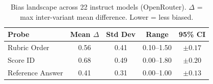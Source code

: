 \begin{table}[h]
\centering\small
\caption{Bias landscape across 22 instruct models (OpenRouter).
$\Delta$ = max inter-variant mean difference. Lower = less biased.}
\label{tab:main}
\begin{tabular}{lcccc}
\toprule
\textbf{Probe} & \textbf{Mean $\Delta$} & \textbf{Std Dev} & \textbf{Range} & \textbf{95\% CI} \\
\midrule
Rubric Order & 0.56 & 0.41 & 0.10--1.50 & $\pm 0.17$ \\
Score ID & 0.68 & 0.49 & 0.00--1.80 & $\pm 0.20$ \\
Reference Answer & 0.41 & 0.31 & 0.00--1.00 & $\pm 0.13$ \\
\bottomrule
\end{tabular}
\end{table}
